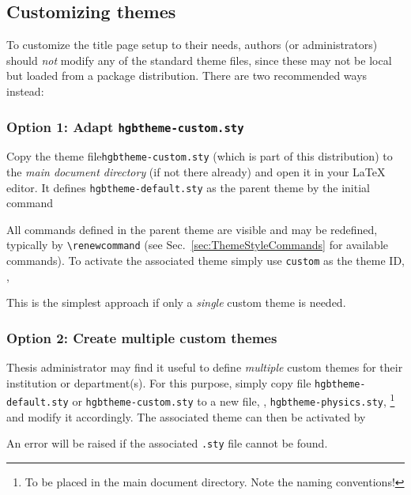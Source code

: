 \documentclass[english]{hgbarticle}
\begin{document}
\subsection{Customizing themes}
\label{sec:CustomizingThemes}

To customize the title page setup to their needs, authors (or administrators) should 
\emph{not} modify any of the standard theme files, since these may not be local but loaded
from a package distribution.
There are two recommended ways instead:

\subsubsection{Option 1: Adapt \texttt{hgbtheme-custom.sty}}

Copy the theme file\texttt{hgbtheme-custom.sty} (which is part of this distribution) to the 
\emph{main document directory} (if not there already) and open it in your LaTeX editor.
It defines \texttt{hgbtheme-default.sty} as the parent theme by the initial command
\begin{LaTeXCode}[numbers=none]
\end{LaTeXCode}
%
All commands defined in the parent theme are visible and may be redefined,
typically by \verb!\renewcommand! (see Sec.\ \ref{sec:ThemeStyleCommands}
for available commands).
To activate the associated theme simply use \texttt{custom} as the theme ID,
\ie,
%
%
This is the simplest approach if only a \emph{single} custom theme is needed.

\subsubsection{Option 2: Create multiple custom themes}

Thesis administrator may find it useful to define \emph{multiple} custom themes for their
institution or department(s).
For this purpose, simply copy file \texttt{hgbtheme-default.sty} or \texttt{hgbtheme-custom.sty}
to a new file, \eg, \texttt{hgbtheme-physics.sty},%
\footnote{To be placed in the main document directory. Note the naming conventions!}
and modify it accordingly. The associated theme can then be activated by
%
%
An error will be raised if the associated \texttt{.sty} file cannot be found.
\end{document}
